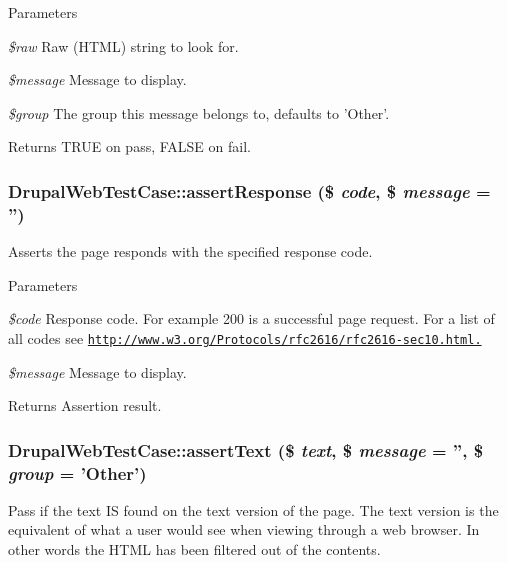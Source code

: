 \begin{DoxyParams}{Parameters}
\item[{\em \$raw}]Raw (HTML) string to look for. \item[{\em \$message}]Message to display. \item[{\em \$group}]The group this message belongs to, defaults to 'Other'. \end{DoxyParams}
\begin{DoxyReturn}{Returns}
TRUE on pass, FALSE on fail. 
\end{DoxyReturn}
\hypertarget{classDrupalWebTestCase_af414857cce5491ca01a2f7ea9d2d60bf}{
\subsubsection[{assertResponse}]{\setlength{\rightskip}{0pt plus 5cm}DrupalWebTestCase::assertResponse (\$ {\em code}, \/  \$ {\em message} = {\ttfamily ''})}}
\label{classDrupalWebTestCase_af414857cce5491ca01a2f7ea9d2d60bf}
Asserts the page responds with the specified response code.


\begin{DoxyParams}{Parameters}
\item[{\em \$code}]Response code. For example 200 is a successful page request. For a list of all codes see \href{http://www.w3.org/Protocols/rfc2616/rfc2616-sec10.html.}{\tt http://www.w3.org/Protocols/rfc2616/rfc2616-\/sec10.html.} \item[{\em \$message}]Message to display. \end{DoxyParams}
\begin{DoxyReturn}{Returns}
Assertion result. 
\end{DoxyReturn}
\hypertarget{classDrupalWebTestCase_ad721f3f08df154f1ccaf7b8ab0d2d9d0}{
\subsubsection[{assertText}]{\setlength{\rightskip}{0pt plus 5cm}DrupalWebTestCase::assertText (\$ {\em text}, \/  \$ {\em message} = {\ttfamily ''}, \/  \$ {\em group} = {\ttfamily 'Other'})}}
\label{classDrupalWebTestCase_ad721f3f08df154f1ccaf7b8ab0d2d9d0}
Pass if the text IS found on the text version of the page. The text version is the equivalent of what a user would see when viewing through a web browser. In other words the HTML has been filtered out of the contents.


